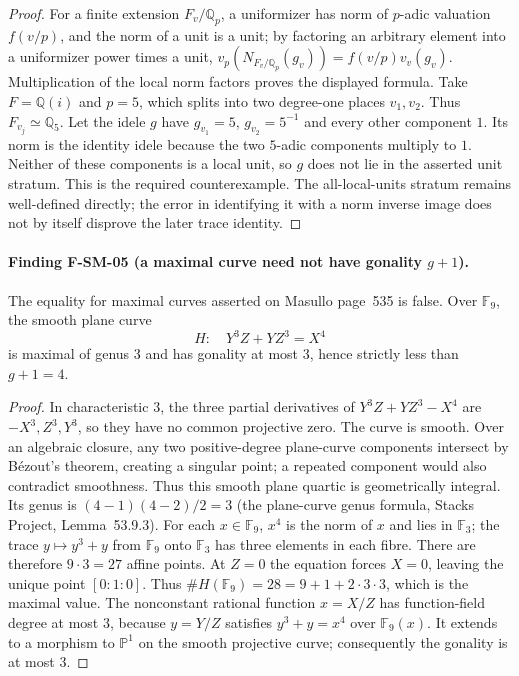 \documentclass[11pt,a4paper]{article}
\theoremstyle{definition}\newtheorem{definition}[theorem]{Definition}
\theoremstyle{remark}\newtheorem{remark}[theorem]{Remark}
\begin{document}
\begin{proof}
For a finite extension $F_v/\mathbb Q_p$, a uniformizer has norm of
$p$-adic valuation $f(v/p)$, and the norm of a unit is a unit; by factoring
an arbitrary element into a uniformizer power times a unit,
$v_p(N_{F_v/\mathbb Q_p}(g_v))=f(v/p)v_v(g_v)$.  Multiplication of the
local norm factors proves the displayed formula.
Take $F=\mathbb Q(i)$ and $p=5$, which splits into two degree-one places
$v_1,v_2$.  Thus $F_{v_j}\simeq\mathbb Q_5$.  Let the idele $g$ have
$g_{v_1}=5$, $g_{v_2}=5^{-1}$ and every other component $1$.
Its norm is the identity idele because the two $5$-adic components multiply
to $1$.  Neither of these components is a local unit, so $g$ does not lie
in the asserted unit stratum.  This is the required counterexample.
The all-local-units stratum remains well-defined directly; the error in
identifying it with a norm inverse image does not by itself disprove
the later trace identity.
\end{proof}

\paragraph{Finding F-SM-05 (a maximal curve need not have gonality $g+1$).}
The equality for maximal curves asserted on Masullo page~535 is false.
Over $\mathbb F_9$, the smooth plane curve
\[
 H:\quad Y^3Z+YZ^3=X^4
\]
is maximal of genus $3$ and has gonality at most $3$, hence strictly
less than $g+1=4$.

\begin{proof}
In characteristic $3$, the three partial derivatives of
$Y^3Z+YZ^3-X^4$ are $-X^3,Z^3,Y^3$, so they have no common projective
zero.  The curve is smooth.  Over an algebraic closure, any two positive-degree
plane-curve components intersect by B\'ezout's theorem, creating a singular
point; a repeated component would also contradict smoothness.  Thus this
smooth plane quartic is geometrically integral.  Its genus is
$(4-1)(4-2)/2=3$ (the plane-curve genus formula, Stacks Project,
Lemma~53.9.3).  For each $x\in\mathbb F_9$, $x^4$
is the norm of $x$ and lies in $\mathbb F_3$; the trace
$y\mapsto y^3+y$ from $\mathbb F_9$ onto $\mathbb F_3$ has three
elements in each fibre.  There are therefore $9\cdot3=27$ affine
points.  At $Z=0$ the equation forces $X=0$, leaving the unique point
$[0:1:0]$.  Thus $\#H(\mathbb F_9)=28=9+1+2\cdot3\cdot3$,
which is the maximal value.  The nonconstant rational function $x=X/Z$
has function-field degree at most $3$, because $y=Y/Z$ satisfies
$y^3+y=x^4$ over $\mathbb F_9(x)$.  It extends to a morphism to
$\mathbb P^1$ on the smooth projective curve; consequently the gonality
is at most $3$.
\end{proof}
\end{document}
